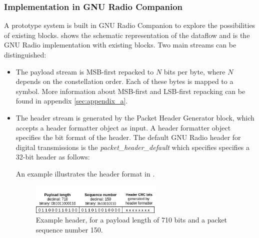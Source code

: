 \subsubsection{Implementation in GNU Radio Companion}
A prototype system is built in GNU Radio Companion to explore the possibilities of existing blocks.  shows the schematic representation of the dataflow and  is the GNU Radio implementation with existing blocks. Two main streams can be distinguished:
\begin{itemize}
\item The payload stream is MSB-first repacked to $N$ bits per byte, where $N$ depends on the constellation order. Each of these bytes is mapped to a symbol. More information about MSB-first and LSB-first repacking can be found in appendix \ref{sec:appendix_a}.
\item The header stream is generated by the Packet Header Generator block, which accepts a header formatter object as input. A header formatter object specifies the bit format of the header. The default GNU Radio header for digital transmissions is
the \textit{packet\_header\_default} \cite{packet_header_default_docs} which specifies specifies a 32-bit header as follows:

An example illustrates the header format in .

\begin{figure}[H]
    \centering
    \includegraphics[width=0.6\textwidth]{img_packets/header.png}
    \caption{Example header, for a payload length of 710 bits and a packet sequence number 150. }
    \label{fig:pheader}
\end{figure}




\end{itemize}

